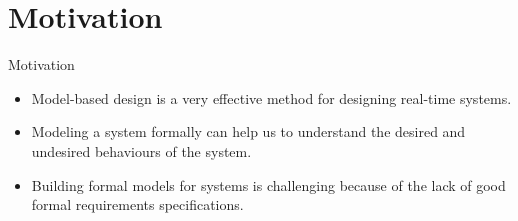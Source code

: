 \documentclass[10pt]{beamer}
\theoremstyle{plain}
\theoremstyle{definition}
\begin{document}
%	
%		
%		
%		
%		


\section{Motivation}

\begin{frame}{Motivation}
	\begin{itemize}
		\item Model-based design is a very effective method for designing real-time systems.
		\item Modeling a system formally can help us to understand the desired and undesired behaviours of the system.
		\item Building formal models for systems is challenging because of the lack of good formal requirements specifications.
	\end{itemize}	
\end{frame}
\end{document}
